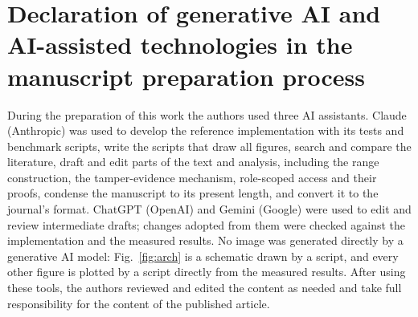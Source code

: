 \documentclass[a4paper,fleqn]{cas-sc}
\begin{document}
\section*{Declaration of generative AI and AI-assisted technologies in the
manuscript preparation process}
During the preparation of this work the authors used three AI assistants.
Claude (Anthropic) was used to develop the reference implementation with its
tests and benchmark scripts, write the scripts that draw all figures, search
and compare the literature,
draft and edit parts of the text and analysis, including the range
construction, the tamper-evidence mechanism, role-scoped access and their
proofs, condense the manuscript to its present length, and convert it to the
journal's format. ChatGPT (OpenAI) and Gemini (Google) were used to edit and
review intermediate drafts; changes adopted from them were checked against the
implementation and the measured results. No image was generated directly by a
generative AI model: Fig.~\ref{fig:arch} is a schematic drawn by a script, and
every other figure is plotted by a script directly from the measured results. After using these tools, the authors reviewed and edited the content
as needed and take full responsibility for the content of the published
article.



\end{document}
